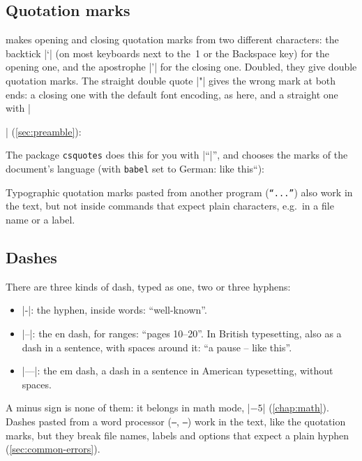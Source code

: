 \subsection{Quotation marks}

 makes opening and closing quotation marks from two different characters:
the backtick \code|`| (on most keyboards next to the~1 or the Backspace key) for the opening one,
and the apostrophe \code|'| for the closing one.
Doubled, they give double quotation marks.
The straight double quote \code|"| gives the wrong mark at both ends:
a closing one with the default font encoding, as here,
and a straight one with \code|\usepackage[T1]{fontenc}| (\autoref{sec:preamble}):


The package \texttt{csquotes} does this for you with \code|\enquote|,
and chooses the marks of the document's language
(with \texttt{babel} set to German: \quotedblbase like this\textquotedblleft):


Typographic quotation marks pasted from another program (\texttt{“...”}) also work in the text,
but not inside commands that expect plain characters, e.g.\ in a file name or a label.

\subsection{Dashes}

There are three kinds of dash, typed as one, two or three hyphens:

\begin{itemize}
    \item \code|-|: the hyphen, inside words: \enquote{well-known}.
    \item \code|--|: the en dash, for ranges: \enquote{pages 10--20}.
        In British typesetting, also as a dash in a sentence, with spaces around it: \enquote{a pause -- like this}.
    \item \code|---|: the em dash, a dash in a sentence in American typesetting, without spaces.
\end{itemize}


A minus sign is none of them: it belongs in math mode, \code|$-5$| (\autoref{chap:math}).
Dashes pasted from a word processor (\texttt{–}, \texttt{—}) work in the text, like the quotation marks,
but they break file names, labels and options that expect a plain hyphen (\autoref{sec:common-errors}).

